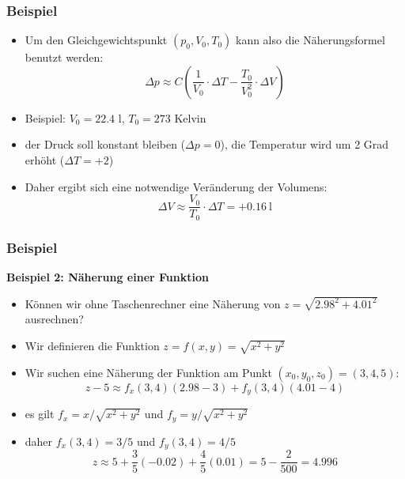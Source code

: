 \begin{frame}
    \frametitle{Beispiel}


    \begin{itemize}
        \item Um den Gleichgewichtspunkt $(p_0,V_0,T_0)$ kann also die Näherungsformel benutzt werden:
        $$
        \Delta p \approx C\left( \frac{1}{V_0}\cdot \Delta T -\frac{T_0}{V_0^2}\cdot \Delta V\right)
        $$
        \item Beispiel: $V_0=22.4$ l, $T_0=273$ Kelvin
        \item der Druck soll konstant bleiben ($\Delta p=0$), die Temperatur wird um 2 Grad erhöht ($\Delta T=+2$)
        \item Daher ergibt sich eine notwendige Veränderung der Volumens:
        $$
        \Delta V \approx \frac{V_0}{T_0}\cdot \Delta T = +0.16~\text{l}
        $$
 
     \end{itemize}
\end{frame}






\begin{frame}
    \frametitle{Beispiel}

    {\bf Beispiel 2: Näherung einer Funktion}
    \begin{itemize}
        \item Können wir ohne Taschenrechner eine Näherung von $z=\sqrt{2.98^2+4.01^2}$ ausrechnen?
        \item Wir definieren die Funktion $z=f(x,y)= \sqrt{x^2+y^2}$
        \item Wir suchen eine Näherung der Funktion am Punkt $(x_0,y_0,z_0)=(3,4,5)$:
        $$
        z-5 \approx f_x(3,4)(2.98-3) + f_y(3,4)(4.01-4)
        $$
        \item es gilt $f_x = x/\sqrt{x^2+y^2}$ und $f_y = y/\sqrt{x^2+y^2}$
        \item daher $f_x(3,4) = 3/5$ und $f_y(3,4) = 4/5$
        $$
        z\approx 5 + \frac{3}{5}(-0.02) + \frac{4}{5}(0.01) = 5-\frac{2}{500} = 4.996
            $$
    \end{itemize}
\end{frame}

        
